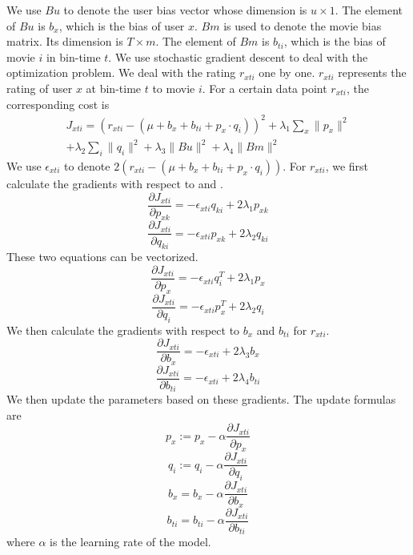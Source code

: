 \documentclass[sigconf]{acmart}
\begin{document}
{We use $Bu$ to denote the user bias vector whose dimension is $u \times 1$. The element of $Bu$ is $b_x$, which is the bias of user $x$. $Bm$ is used to denote the movie bias matrix. Its dimension is $T \times m$. The element of $Bm$ is $b_{ti}$, which is the bias of movie $i$ in bin-time $t$. We use stochastic gradient descent to deal with the optimization problem. We deal with the rating $r_{xti}$ one by one. $r_{xti}$ represents the rating of user $x$ at bin-time $t$ to movie $i$. For a certain data point $r_{xti}$, the corresponding cost is
\begin{equation}
\begin{split}
    J_{xti} = (r_{xti} - (\mu + b_x + b_{ti} + p_x \cdot q_i))^2 + \lambda_1 \sum_x \| p_x \|^2 \\ + \lambda_2 \sum_i \| q_i \|^2 + \lambda_3 \| Bu \|^2 + \lambda_4 \| Bm \|^2
\end{split}
\end{equation}
We use $\epsilon_{xti}$ to denote $2(r_{xti} - (\mu + b_x + b_{ti} + p_x \cdot q_i))$. For $r_{xti}$, we first calculate the gradients with respect to  and .
\begin{equation}
    \frac{\partial J_{xti}}{\partial p_{xk}} = - \epsilon_{xti} q_{ki} + 2 \lambda_1 p_{xk}
\end{equation}
\begin{equation}
    \frac{\partial J_{xti}}{\partial q_{ki}} = - \epsilon_{xti} p_{xk} + 2 \lambda_2 q_{ki}
\end{equation}
These two equations can be vectorized.
\begin{equation}
    \frac{\partial J_{xti}}{\partial p_x} = - \epsilon_{xti} q_i^T + 2 \lambda_1 p_x
\end{equation}
\begin{equation}
    \frac{\partial J_{xti}}{\partial q_i} = - \epsilon_{xti} p_x^T + 2 \lambda_2 q_i
\end{equation}
We then calculate the gradients with respect to $b_x$ and $b_{ti}$ for $r_{xti}$.
\begin{equation}
    \frac{\partial J_{xti}}{\partial b_x} = - \epsilon_{xti} + 2 \lambda_3 b_x
\end{equation}
\begin{equation}
    \frac{\partial J_{xti}}{\partial b_{ti}} = - \epsilon_{xti} + 2 \lambda_4 b_{ti}
\end{equation}
We then update the parameters based on these gradients. The update formulas are
\begin{equation}
    p_x := p_x - \alpha \frac{\partial J_{xti}}{\partial p_x}
\end{equation}
\begin{equation}
    q_i := q_i - \alpha \frac{\partial J_{xti}}{\partial q_i}
\end{equation}
\begin{equation}
    b_x = b_x - \alpha \frac{\partial J_{xti}}{\partial b_x}
\end{equation}
\begin{equation}
    b_{ti} = b_{ti} - \alpha \frac{\partial J_{xti}}{\partial b_{ti}}
\end{equation}
where $\alpha$ is the learning rate of the model.

}
\end{document}
